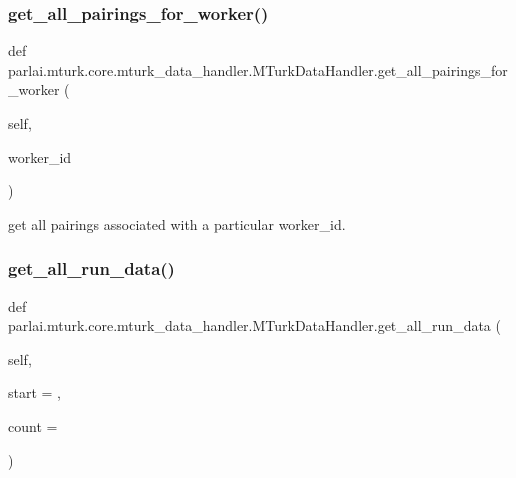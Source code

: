 \subsubsection{\texorpdfstring{get\+\_\+all\+\_\+pairings\+\_\+for\+\_\+worker()}{get\_all\_pairings\_for\_worker()}}
{\footnotesize\ttfamily def parlai.\+mturk.\+core.\+mturk\+\_\+data\+\_\+handler.\+M\+Turk\+Data\+Handler.\+get\+\_\+all\+\_\+pairings\+\_\+for\+\_\+worker (\begin{DoxyParamCaption}\item[{}]{self,  }\item[{}]{worker\+\_\+id }\end{DoxyParamCaption})}

\begin{DoxyVerb}get all pairings associated with a particular worker_id.
\end{DoxyVerb}
 \mbox{\label{classparlai_1_1mturk_1_1core_1_1mturk__data__handler_1_1MTurkDataHandler_a260b4003fe27797a7e49547db992d06e}} 
\subsubsection{\texorpdfstring{get\+\_\+all\+\_\+run\+\_\+data()}{get\_all\_run\_data()}}
{\footnotesize\ttfamily def parlai.\+mturk.\+core.\+mturk\+\_\+data\+\_\+handler.\+M\+Turk\+Data\+Handler.\+get\+\_\+all\+\_\+run\+\_\+data (\begin{DoxyParamCaption}\item[{}]{self,  }\item[{}]{start = {},  }\item[{}]{count = {} }\end{DoxyParamCaption})}

